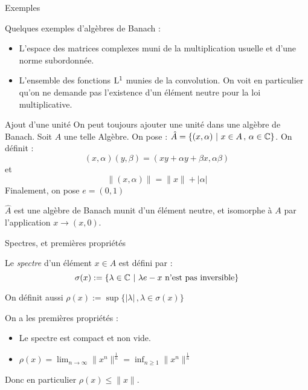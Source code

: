\documentclass[11pt, xcolor=table]{beamer}
\begin{document}
\begin{frame}{Exemples}
    
\begin{ex}
    Quelques exemples d'algèbres de Banach  :

    \begin{itemize}
        \item L'espace des matrices complexes muni de la multiplication usuelle et d'une norme subordonnée. 
        \item L'ensemble des fonctions $\mathrm{L}^1$ munies de la convolution. On voit en particulier qu'on ne demande pas
            l'existence d'un élément neutre pour la loi multiplicative.
    \end{itemize}
    \end{ex}
\end{frame}

\begin{frame}{Ajout d'une unité}
    On peut toujours ajouter une unité dans une algèbre de Banach. Soit $A$ une telle Algèbre.
    On pose :
    $\hat{A} = \{ ( x, \alpha) \ | \ x \in A \, ,\, \alpha \in \mathbb{C} \}$. On définit :
    \[
        (x, \alpha) ( y, \beta) = (xy + \alpha y + \beta x, \alpha \beta )
        \]
    et 
    \[
        \| (x, \alpha) \| = \|x\| + |\alpha|
        \]
    Finalement, on pose $e = (0, 1)$
    \begin{myth}
        $\hat{A}$ est une algèbre de Banach munit d'un élément neutre, et isomorphe à $A$ par l'application $x \to (x, 0) $.
    \end{myth}
\end{frame}

\begin{frame}{Spectres, et premières propriétés}
    \begin{mydef}
        Le \emph{spectre} d'un élément $x \in A$ est défini par :
        \[
            \sigma(x) := \{ \lambda \in \mathbb{C} \ | \ \lambda e - x  \ \text{n'est pas inversible} \} 
        \]
    \end{mydef}
    On définit aussi $\rho(x) := \sup \{ |\lambda| \, , \lambda \in \sigma(x) \}$

    On a les premières propriétés :

    \begin{myth}
        \begin{itemize}
                \item Le spectre est compact et non vide.
                \item $\rho(x) = \lim_{n \longrightarrow \infty} \| x^n \|^\frac{1}{n} = \inf_{n \geq 1} \| x^n \|^\frac{1}{n}$
        \end{itemize}
        Donc en particulier $\rho(x) \leq \| x \| $.
    \end{myth}
\end{frame}
\end{document}
